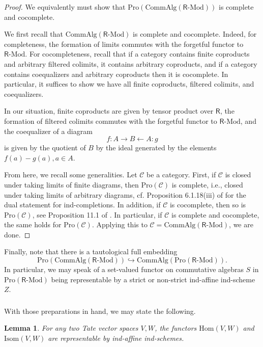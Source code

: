 \documentclass{amsart}
\newtheorem{Lem}[Thm]{Lemma}
\theoremstyle{definition}
\newcommand{\sC}{\mathscr{C}}
\newcommand{\Pro}{\on{Pro}}
\newcommand{\sss}{\subsubsection{}}
\newcommand{\Hom}{\on{Hom}}
\renewcommand{\mod}{\text{-}\on{Mod}}
\newcommand{\on}{\mathrm}
\newcommand{\Ring}{\mathsf{R}}
\numberwithin{equation}{section}
\begin{document}
\begin{proof} We equivalently must show that $\on{Pro}(\on{CommAlg}(\Ring\mod))$ is complete and cocomplete.

We first recall that $\on{CommAlg}(\Ring\mod)$ is complete and cocomplete. Indeed, for completeness, the formation of limits commutes with the forgetful functor to $\Ring\mod$. For cocompleteness, recall that if a category contains finite coproducts and arbitrary filtered colimits, it contains arbitrary coproducts, and if a category contains  coequalizers and arbitrary coproducts  then it is cocomplete. In particular, it suffices to show we have all finite coproducts, filtered colimits, and coequalizers. 




In our situation, finite coproducts are given by tensor product over $\Ring$, the formation of filtered colimits commutes with the forgetful functor to $\Ring\mod$, and the coequalizer of a diagram $$f: A \rightarrow B \leftarrow A:g$$is given by the quotient of $B$ by the ideal generated by the elements $f(a) - g(a), a \in A$. 


From here, we recall some generalities. Let $\sC$ be a category. First, if $\sC$ is closed under taking limits of finite diagrams, then $\Pro(\sC)$ is complete, i.e., closed under taking limits of arbitrary diagrams, cf. Proposition 6.1.18(iii) of \cite{KS} for the dual statement for ind-completions. In addition, if $\sC$ is cocomplete, then so is $\Pro(\sC)$, see Proposition 11.1 of \cite{Isak}. In particular, if $\sC$ is complete and cocomplete, the same holds for $\Pro(\sC)$. Applying this to $\sC = \on{CommAlg}(\Ring\mod)$, we are done. \end{proof}



Finally, note that there is a tautological full embedding 
$$\on{Pro}(\on{CommAlg}(\Ring\mod)) \hookrightarrow \on{CommAlg}(\on{Pro}(\Ring\mod)).$$
In particular, we may speak of a set-valued functor on commutative algebras $S$ in $\on{Pro}(\Ring\mod)$ being representable by a strict or non-strict ind-affine ind-scheme $Z$. 




\sss With those preparations in hand, we may state the following. 

\begin{Lem}\label{l:homtate} For any two Tate vector spaces $V,W$, the functors $\Hom(V,W)$ and $\on{Isom}(V,W)$ are representable by ind-affine ind-schemes.  
\end{Lem}
\end{document}
